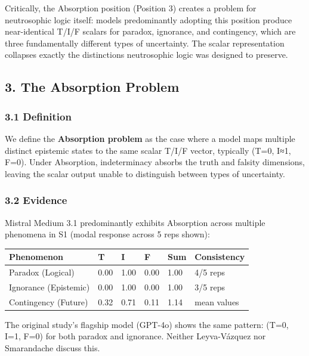 \documentclass[
]{article}
\begin{document}
Critically, the Absorption position (Position 3) creates a problem for
neutrosophic logic itself: models predominantly adopting this position
produce near-identical T/I/F scalars for paradox, ignorance, and
contingency, which are three fundamentally different types of
uncertainty. The scalar representation collapses exactly the
distinctions neutrosophic logic was designed to preserve.

\hypertarget{the-absorption-problem}{%
\subsection{3. The Absorption Problem}\label{the-absorption-problem}}

\hypertarget{definition}{%
\subsubsection{3.1 Definition}\label{definition}}

We define the \textbf{Absorption problem} as the case where a model maps
multiple distinct epistemic states to the same scalar T/I/F vector,
typically (T=0, I≈1, F=0). Under Absorption, indeterminacy absorbs the
truth and falsity dimensions, leaving the scalar output unable to
distinguish between types of uncertainty.

\hypertarget{evidence}{%
\subsubsection{3.2 Evidence}\label{evidence}}

Mistral Medium 3.1 predominantly exhibits Absorption across multiple
phenomena in S1 (modal response across 5 reps shown):

\begin{longtable}[]{@{}llllll@{}}
\toprule\noalign{}
Phenomenon & T & I & F & Sum & Consistency \\
\midrule\noalign{}
\endhead
\bottomrule\noalign{}
\endlastfoot
Paradox (Logical) & 0.00 & 1.00 & 0.00 & 1.00 & 4/5 reps \\
Ignorance (Epistemic) & 0.00 & 1.00 & 0.00 & 1.00 & 3/5 reps \\
Contingency (Future) & 0.32 & 0.71 & 0.11 & 1.14 & mean values \\
\end{longtable}

The original study's flagship model (GPT-4o) shows the same pattern:
(T=0, I=1, F=0) for both paradox and ignorance. Neither Leyva-Vázquez
nor Smarandache discuss this.
\end{document}
